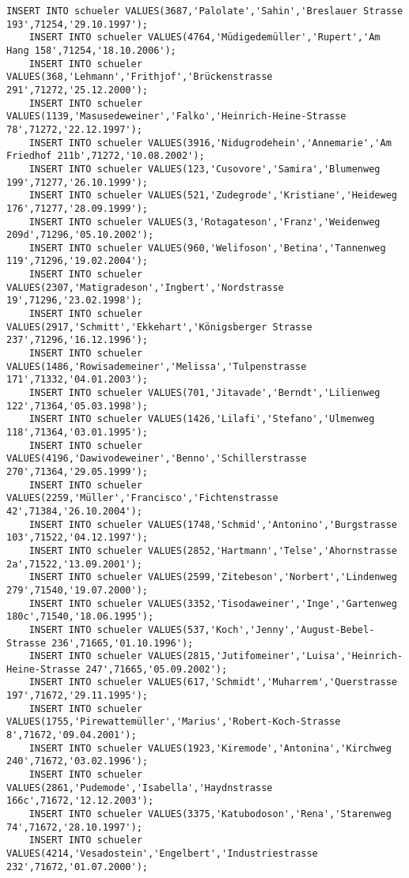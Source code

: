 \begin{lstlisting}[breaklines=True, numbers=none, basicstyle=\tiny, keepspaces=false]
	INSERT INTO schueler VALUES(3687,'Palolate','Sahin','Breslauer Strasse 193',71254,'29.10.1997');
	INSERT INTO schueler VALUES(4764,'Müdigedemüller','Rupert','Am Hang 158',71254,'18.10.2006');
	INSERT INTO schueler VALUES(368,'Lehmann','Frithjof','Brückenstrasse 291',71272,'25.12.2000');
	INSERT INTO schueler VALUES(1139,'Masusedeweiner','Falko','Heinrich-Heine-Strasse 78',71272,'22.12.1997');
	INSERT INTO schueler VALUES(3916,'Nidugrodehein','Annemarie','Am Friedhof 211b',71272,'10.08.2002');
	INSERT INTO schueler VALUES(123,'Cusovore','Samira','Blumenweg 199',71277,'26.10.1999');
	INSERT INTO schueler VALUES(521,'Zudegrode','Kristiane','Heideweg 176',71277,'28.09.1999');
	INSERT INTO schueler VALUES(3,'Rotagateson','Franz','Weidenweg 209d',71296,'05.10.2002');
	INSERT INTO schueler VALUES(960,'Welifoson','Betina','Tannenweg 119',71296,'19.02.2004');
	INSERT INTO schueler VALUES(2307,'Matigradeson','Ingbert','Nordstrasse 19',71296,'23.02.1998');
	INSERT INTO schueler VALUES(2917,'Schmitt','Ekkehart','Königsberger Strasse 237',71296,'16.12.1996');
	INSERT INTO schueler VALUES(1486,'Rowisademeiner','Melissa','Tulpenstrasse 171',71332,'04.01.2003');
	INSERT INTO schueler VALUES(701,'Jitavade','Berndt','Lilienweg 122',71364,'05.03.1998');
	INSERT INTO schueler VALUES(1426,'Lilafi','Stefano','Ulmenweg 118',71364,'03.01.1995');
	INSERT INTO schueler VALUES(4196,'Dawivodeweiner','Benno','Schillerstrasse 270',71364,'29.05.1999');
	INSERT INTO schueler VALUES(2259,'Müller','Francisco','Fichtenstrasse 42',71384,'26.10.2004');
	INSERT INTO schueler VALUES(1748,'Schmid','Antonino','Burgstrasse 103',71522,'04.12.1997');
	INSERT INTO schueler VALUES(2852,'Hartmann','Telse','Ahornstrasse 2a',71522,'13.09.2001');
	INSERT INTO schueler VALUES(2599,'Zitebeson','Norbert','Lindenweg 279',71540,'19.07.2000');
	INSERT INTO schueler VALUES(3352,'Tisodaweiner','Inge','Gartenweg 180c',71540,'18.06.1995');
	INSERT INTO schueler VALUES(537,'Koch','Jenny','August-Bebel-Strasse 236',71665,'01.10.1996');
	INSERT INTO schueler VALUES(2815,'Jutifomeiner','Luisa','Heinrich-Heine-Strasse 247',71665,'05.09.2002');
	INSERT INTO schueler VALUES(617,'Schmidt','Muharrem','Querstrasse 197',71672,'29.11.1995');
	INSERT INTO schueler VALUES(1755,'Pirewattemüller','Marius','Robert-Koch-Strasse 8',71672,'09.04.2001');
	INSERT INTO schueler VALUES(1923,'Kiremode','Antonina','Kirchweg 240',71672,'03.02.1996');
	INSERT INTO schueler VALUES(2861,'Pudemode','Isabella','Haydnstrasse 166c',71672,'12.12.2003');
	INSERT INTO schueler VALUES(3375,'Katubodoson','Rena','Starenweg 74',71672,'28.10.1997');
	INSERT INTO schueler VALUES(4214,'Vesadostein','Engelbert','Industriestrasse 232',71672,'01.07.2000');

\end{lstlisting}
